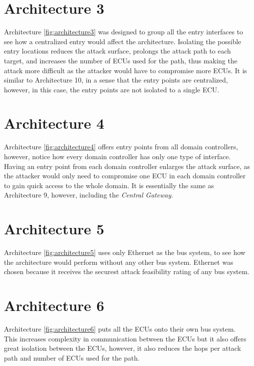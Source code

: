 \section{Architecture 3}
\label{subsec:arch3}

Architecture \ref{fig:architecture3} was designed to group all the entry interfaces to see how a centralized entry would affect the architecture. 
Isolating the possible entry locations reduces the attack surface, prolongs the attack path to each target, 
and increases the number of ECUs used for the path, thus making the attack more difficult as the attacker would have to compromise more ECUs. 
It is similar to Architecture 10, in a sense that the entry points are centralized, however, in this case, the entry points are not isolated to a single ECU.

\section{Architecture 4}
\label{subsec:arch4}

Architecture \ref{fig:architecture4} offers entry points from all domain controllers, 
however, notice how every domain controller has only one type of interface. 
Having an entry point from each domain controller enlarges the attack surface, 
as the attacker would only need to compromise one ECU in each domain controller to gain quick access to the whole domain. 
It is essentially the same as Architecture 9, however, including the \textit{Central Gateway}.

\section{Architecture 5}
\label{subsec:arch5}

Architecture \ref{fig:architecture5} uses only Ethernet as the bus system, 
to see how the architecture would perform without any other bus system. 
Ethernet was chosen because it receives the securest attack feasibility rating of any bus system.

\section{Architecture 6}
\label{subsec:arch6}

Architecture \ref{fig:architecture6} puts all the ECUs onto their own bus system. 
This increases complexity in communication between the ECUs but it also offers great isolation between the ECUs, 
however, it also reduces the hops per attack path and number of ECUs used for the path.

